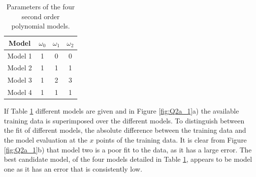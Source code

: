 \documentclass{article}
\begin{document}
\begin{table}[!htb]
\centering
\caption{Parameters of the four second order polynomial models.}
\label{tab:Q2_table1}
\begin{tabular}{cccc}
\hline
Model & $\omega_0$ & $\omega_1$ & $\omega_2$ \\ \hline
Model 1 & 1 & 0 & 0 \\
Model 2 & 1 & 1 & 1 \\
Model 3 & 1 & 2 & 3 \\
Model 4 & 1 & 1 & 1 \\ \hline
\end{tabular}
\end{table}
 If Table \ref{tab:Q2_table1} different models are given and in Figure \ref{fig:Q2a_1}a) the available training data  is superimposed over the different models. To distinguish between the fit of different models, the absolute difference between the training data and the model evaluation at the $x$ points of the training data. It is clear from Figure \ref{fig:Q2a_1}b) that model two is a poor fit to the data, as it has a large error. The best candidate model, of the four models detailed in Table \ref{tab:Q2_table1}, appears to be model one as it has an error that is consistently low. 
\end{document}

